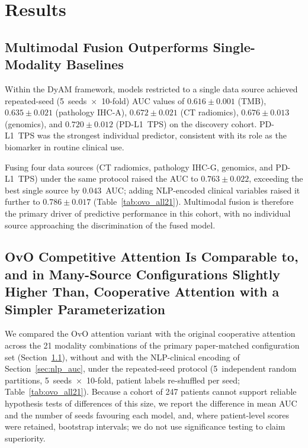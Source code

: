 \section{Results}
\label{sec:results}


\subsection{Multimodal Fusion Outperforms Single-Modality Baselines}
\label{sec:baselines}

Within the DyAM framework, models restricted to a single data source
achieved repeated-seed (5~seeds~$\times$~10-fold) AUC values of
$0.616 \pm 0.001$ (TMB), $0.635 \pm 0.021$ (pathology IHC-A),
$0.672 \pm 0.021$ (CT radiomics), $0.676 \pm 0.013$ (genomics), and
$0.720 \pm 0.012$ (PD-L1~TPS) on the discovery cohort.
PD-L1~TPS was the strongest individual predictor, consistent with its role
as the biomarker in routine clinical use.

Fusing four data sources (CT radiomics, pathology IHC-G, genomics, and
PD-L1~TPS) under the same protocol raised the AUC to $0.763 \pm 0.022$,
exceeding the best single source by $0.043$~AUC; adding NLP-encoded clinical
variables raised it further to $0.786 \pm 0.017$
(Table~\ref{tab:ovo_all21}).
Multimodal fusion is therefore the primary driver of predictive performance
in this cohort, with no individual source approaching the discrimination of
the fused model.


\subsection{OvO Competitive Attention Is Comparable to, and in Many-Source Configurations Slightly Higher Than, Cooperative Attention with a Simpler Parameterization}
\label{sec:ovo}

We compared the OvO attention variant with the original cooperative attention across the 21 modality
combinations of the primary paper-matched configuration set (Section~\ref{sec:baselines}),
without and with the NLP-clinical encoding of Section~\ref{sec:nlp_auc}, under the repeated-seed protocol
(5~independent random partitions, 5~seeds~$\times$~10-fold, patient labels re-shuffled per seed;
Table~\ref{tab:ovo_all21}).
Because a cohort of 247 patients cannot support reliable hypothesis tests of differences of this size,
we report the difference in mean AUC and the number of seeds favouring each model, and, where patient-level
scores were retained, bootstrap intervals; we do not use significance testing to claim superiority.

